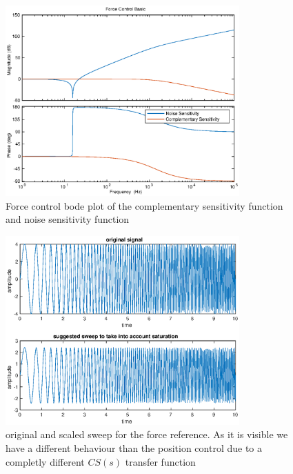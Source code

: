 \documentclass[a4paper,11pt]{article}
\begin{document}
\bigskip
\begin{figure}[H]
\begin{center}
\includegraphics[width=0.8\textwidth]{images/force_tf.eps}
\end{center}
\caption{Force control bode plot of the complementary sensitivity function and noise sensitivity function}
\label{fig:force_tf}
\end{figure}


\begin{figure}[H]
\begin{center}
\includegraphics[width=0.8\textwidth]{images/force_scaled.eps}
\end{center}
\caption{original and scaled sweep for the force reference. As it is visible we have a different behaviour than the position control due to a completly different $CS(s)$ transfer function}
\label{fig:force_ref}
\end{figure}
\end{document}
